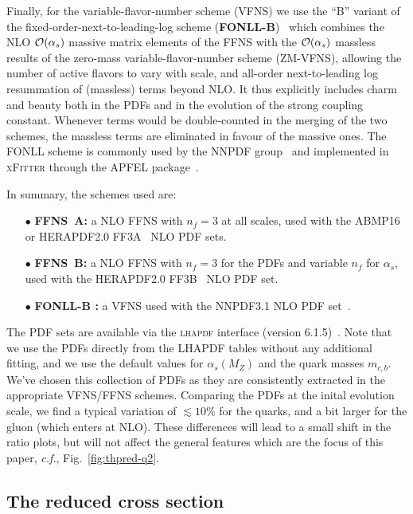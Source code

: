 \documentclass[pdftex,twocolumn,epjc3]{svjour3}          %
\newcommand{\abmp} {ABMP16\xspace}
\newcommand{\nnpdf} {NNPDF3.1\xspace}
\newcommand{\xfitter} {\textsc{xFitter}\xspace}
\newcommand{\lhapdf} {{\textsc{lhapdf}}\xspace}
\newcommand{\ffns} {{FFNS~A}\xspace}
\newcommand{\ffnsb} {{FFNS~B}\xspace}
\newcommand{\ffthreea} {{\hbox{HERAPDF2.0} FF3A}\xspace}
\newcommand{\ffthreeb} {{\hbox{HERAPDF2.0} FF3B}\xspace}
\begin{document}
Finally, for the variable-flavor-number scheme (VFNS) we use the ``B''
variant of the fixed-order-next-to-leading-log scheme ({\bf FONLL-B})~\cite{Forte:2010ta}
which combines the NLO ${\cal O}(\alpha_s)$ massive matrix elements of
the FFNS with the ${\cal O}(\alpha_s)$ massless results of the
zero-mass variable-flavor-number scheme (ZM-VFNS), allowing the number
of active flavors to vary with scale, and all-order next-to-leading
log resummation of (massless) terms beyond NLO.  It thus explicitly
includes charm and beauty both in the PDFs and in the evolution of the
strong coupling constant.  Whenever terms would be double-counted in
the merging of the two schemes, the massless terms are eliminated in
favour of the massive ones. The FONLL scheme is commonly used by the
NNPDF group~\cite{Ball:2017nwa} and implemented in \xfitter through
the APFEL package~\cite{Bertone:2013vaa}.

In summary, the schemes used are:
\begin{itemize}
  \setlength\itemsep{1em}

\item[$\bullet$] {\bf \ffns :} a NLO FFNS with $n_f = 3$ at all
  scales, used with the \abmp~\cite{Alekhin:2018pai} or
  \ffthreea~\cite{Abramowicz:2015mha} NLO PDF sets.

\item[$\bullet$] {\bf \ffnsb :} a NLO FFNS with $n_f = 3$ for the PDFs
  and variable $n_f$ for $\alpha_s$, used with the
  \ffthreeb~\cite{Abramowicz:2015mha} NLO PDF set.

\item[$\bullet$] {\bf FONLL-B :} a VFNS used with the \nnpdf NLO PDF
  set~\cite{Ball:2017nwa}.
\end{itemize}
%
The PDF sets are available via the \lhapdf interface (version
6.1.5)~\cite{Buckley:2014ana}.
%
Note that we use the PDFs directly from the LHAPDF tables without any additional fitting,
and we use the default values for $\alpha_s(M_Z)$ and the quark masses $m_{c,b}$.
%
  We've chosen this collection of PDFs as they are consistently extracted in the appropriate VFNS/FFNS schemes.
  Comparing the PDFs at the inital evolution scale,
  we find a  typical variation of $\lesssim 10\%$ for the quarks, and  a bit larger for the gluon (which enters at NLO).
  These differences will lead to a small shift in the ratio plots,
  but will not affect the general features which are the focus of this paper,
  {\it c.f.}, Fig.~\ref{fig:thpred-q2}.

\subsection{The reduced cross section}\label{sec-redsigma}
\end{document}
